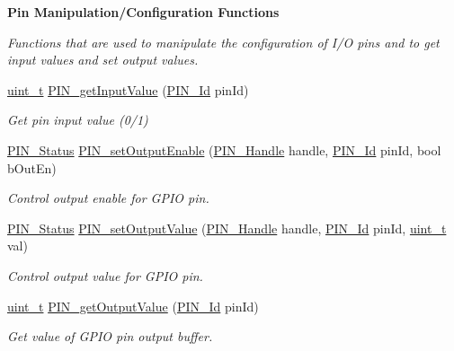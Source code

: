 \begin{Indent}{\bf Pin Manipulation/\-Configuration Functions}\par
{\em Functions that are used to manipulate the configuration of I/\-O pins and to get input values and set output values. }\begin{DoxyCompactItemize}
\item 
\hyperlink{_p_i_n_8h_a12a1e9b3ce141648783a82445d02b58d}{uint\-\_\-t} \hyperlink{_p_i_n_8h_a9bfcc2ddeaaac6dcd90d31ff0c125f3d}{P\-I\-N\-\_\-get\-Input\-Value} (\hyperlink{_p_i_n_8h_a9ae8197f460bb76ea09a84f47d09921f}{P\-I\-N\-\_\-\-Id} pin\-Id)
\begin{DoxyCompactList}\small\item\em Get pin input value (0/1) \end{DoxyCompactList}\item 
\hyperlink{_p_i_n_8h_abe0ad59bbf09e51fe37195a5e70b23f6}{P\-I\-N\-\_\-\-Status} \hyperlink{_p_i_n_8h_ace57b32daf13b67b2d8bb1b8470b5cd6}{P\-I\-N\-\_\-set\-Output\-Enable} (\hyperlink{_p_i_n_8h_afb2de52b054638f63c39df1f30a0d88d}{P\-I\-N\-\_\-\-Handle} handle, \hyperlink{_p_i_n_8h_a9ae8197f460bb76ea09a84f47d09921f}{P\-I\-N\-\_\-\-Id} pin\-Id, bool b\-Out\-En)
\begin{DoxyCompactList}\small\item\em Control output enable for G\-P\-I\-O pin. \end{DoxyCompactList}\item 
\hyperlink{_p_i_n_8h_abe0ad59bbf09e51fe37195a5e70b23f6}{P\-I\-N\-\_\-\-Status} \hyperlink{_p_i_n_8h_aa928e8e84148f7df7bfd2fb46e475016}{P\-I\-N\-\_\-set\-Output\-Value} (\hyperlink{_p_i_n_8h_afb2de52b054638f63c39df1f30a0d88d}{P\-I\-N\-\_\-\-Handle} handle, \hyperlink{_p_i_n_8h_a9ae8197f460bb76ea09a84f47d09921f}{P\-I\-N\-\_\-\-Id} pin\-Id, \hyperlink{_p_i_n_8h_a12a1e9b3ce141648783a82445d02b58d}{uint\-\_\-t} val)
\begin{DoxyCompactList}\small\item\em Control output value for G\-P\-I\-O pin. \end{DoxyCompactList}\item 
\hyperlink{_p_i_n_8h_a12a1e9b3ce141648783a82445d02b58d}{uint\-\_\-t} \hyperlink{_p_i_n_8h_a4a05603f0e075a37af59ed66fd6c6443}{P\-I\-N\-\_\-get\-Output\-Value} (\hyperlink{_p_i_n_8h_a9ae8197f460bb76ea09a84f47d09921f}{P\-I\-N\-\_\-\-Id} pin\-Id)
\begin{DoxyCompactList}\small\item\em Get value of G\-P\-I\-O pin output buffer. \end{DoxyCompactList}\item 

\end{DoxyCompactItemize}
\end{Indent}
